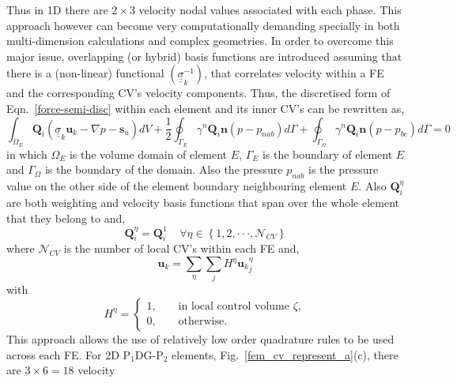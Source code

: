 \documentclass[preprint,authoryear,12pt]{elsarticle}
\begin{document}
{Thus in 1D there are $2\times 3$ velocity nodal values associated with
each phase. This approach however can become very computationally
demanding specially in both multi-dimension calculations and complex
geometries.  In order to overcome this major issue, overlapping (or
hybrid) basis functions are introduced assuming that there is a
(non-linear) functional $\left({\underline {\underline
    \sigma}}_k^{-1}\right)$, that correlates velocity within a FE and
the corresponding CV's velocity components. Thus, the discretised form
of Eqn.~\ref{force-semi-disc} within each element and its inner CV's
can be rewritten as,
\begin{equation} 
  \int_{\Omega_E} {\mathbf Q}_i \left({\underline {\underline \sigma}}_k
      {\mathbf u}_k - \nabla p -{\mathbf s}_u \right) dV +
     \frac{1}{2} \oint_{\Gamma_{E}}\gamma^n  {\mathbf Q}_i {\mathbf n} \left(p -
      p_{nab}\right) d\Gamma +
      \oint_{\Gamma_{\Omega}} \gamma^n {\mathbf Q}_i {\mathbf n} \left(p -
      p_{bc}\right) d\Gamma = 0
\label{force-semi-disc} 
\end{equation} 
in which $\Omega_E$ is the volume domain of element $E$, $\Gamma_{E}$ is the 
boundary of element $E$ and $\Gamma_{\Omega}$ is the boundary of the domain. 
Also the pressure $p_{nab}$ is the pressure value on the other side of the element 
boundary neighbouring element $E$. Also ${\mathbf Q}_{i}^{\eta}$ are both weighting and velocity basis
functions that span over the whole element that they belong to and,
\begin{displaymath}
{\mathbf Q}_{i}^{\eta} = {\mathbf Q}_{i}^{1} \;\;\;\; \forall
\eta\in\left\{1,2,\cdot\cdot\cdot,\mathcal{N}_{CV}\right\}
\end{displaymath}
where $\mathcal{N}_{CV}$ is the number of local CV's within each FE
and,
\begin{displaymath}
\mathbf{u}_{k} = \sum\limits_{\eta} \sum\limits_{j} H^{\eta}
       {\mathbf{u}_{k}}_{j}^{\eta}
\end{displaymath}
with
\begin{displaymath}
H^{\eta} =
\begin{cases}
1, \;\;\;\; & \text{in local control volume }\zeta, \\ 0, \;\;\;\; &
\text{otherwise}.
\end{cases}
\end{displaymath}
This approach allows the use of relatively low order quadrature rules
to be used across each FE.  For 2D P$_{1}$DG-P$_{2}$ elements,
Fig.~\ref{fem_cv_represent_a}(c), there are $3\times6=18$ velocity
}
\end{document}
